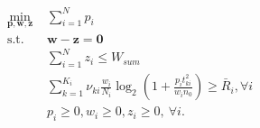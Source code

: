 \documentclass[journal]{IEEEtran}
\begin{document}
\begin{subequations}\label{eq11}
	\begin{align}
	\min_{\mathbf{p}, \mathbf{w}, \mathbf{z}}\ & \sum\limits_{i = 1}^{N} p_i \label{q11a} \\ \mbox{s.t.} \quad &  \mathbf{w} - \mathbf{z} = \mathbf{0} \label{q11b} \\ \quad &  \sum\limits_{i = 1}^{N}z_i \leq W_{sum} \label{q11c} \\ \quad &  \sum\limits_{k = 1}^{K_i}\nu_{ki}\frac{w_i}{N_i}\log_2\left(1 + \frac{p_it_{ki}^2}{w_in_0}\right) \geq \bar{R}_i, \forall i \label{q11d}\\
	& p_i \geq 0, w_i \geq 0, z_i \geq 0, \ \forall i. \label{q11e}
	\end{align}
\end{subequations}
\end{document}
